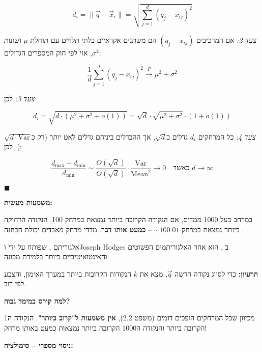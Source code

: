 \[
d_i = \|\vec{q} - \vec{x}_i\| = \sqrt{\sum_{j=1}^{d} (q_j - x_{ij})^2}
\]

\textit{צעד 2:} אם המרכיבים $(q_j - x_{ij})$ הם משתנים אקראיים בלתי-תלויים עם תוחלת $\mu$ ושונות $\sigma^2$, אזי לפי חוק המספרים הגדולים:

\[
\frac{\num{1}}{d}\sum_{j=1}^{d} (q_j - x_{ij})^2 \xrightarrow{P} \mu^2 + \sigma^2
\]

\textit{צעד 3:} לכן:

\[
d_i = \sqrt{d \cdot (\mu^2 + \sigma^2 + o(\num{1}))} = \sqrt{d} \cdot \sqrt{\mu^2 + \sigma^2} \cdot (1 + o(\num{1}))
\]

\textit{צעד 4:} כל המרחקים $d_i$ גדלים כ\en{-}$\sqrt{d}$, אך ההבדלים ביניהם גדלים לאט יותר (רק כ\en{-}$\sqrt{d \cdot \text{Var}}$). לכן:

\[
\frac{d_{\max} - d_{\min}}{d_{\min}} \sim \frac{O(\sqrt{d})}{ O(\sqrt{d})} \cdot \frac{\text{Var}}{\text{Mean}^2} \to \num{0} \quad \text{כאשר } d \to \infty
\]

$\blacksquare$

\textbf{משמעות מעשית:}

במרחב בעל \num{1000} ממדים, אם הנקודה הקרובה ביותר נמצאת במרחק \num{100}, הנקודה הרחוקה ביותר נמצאת במרחק $\sim \num{100.01}$ – \textbf{כמעט אותו דבר}. מדדי מרחק מאבדים יכולת הבחנה \cite{beyer1999, aggarwal2001}.


אלגוריתם , שפותח על ידי  ו\en{-}Joseph Hodges ב\en{-} \cite{fix1951}, הוא אחד האלגוריתמים הפשוטים והאינטואיטיביים ביותר בלמידת מכונה.

\textbf{הרעיון:} כדי לסווג נקודה חדשה $\vec{q}$, מצא את $k$ הנקודות הקרובות ביותר במערך האימון, והצבע לפי רוב.

\textbf{למה  קורס במימד גבוה?}

מכיוון שכל המרחקים הופכים דומים (משפט \num{2.2}), \textbf{אין משמעות ל"קרוב ביותר"}. הנקודה ה\en{-}\num{1} הקרובה ביותר והנקודה ה\en{-}\num{1000} הקרובה ביותר נמצאות כמעט באותו מרחק!

\textbf{ניסוי מספרי – סימולציה:}

